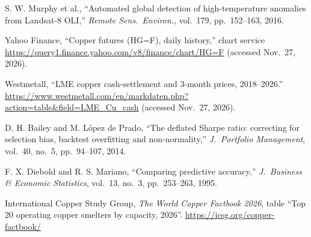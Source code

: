 \documentclass[10pt,a4paper]{article}
\begin{document}
\begin{enumerate}[label={[\arabic*]},leftmargin=2.2em,itemsep=1pt]
\item S. W. Murphy et al., ``Automated global detection of high-temperature anomalies from Landsat-8 OLI,'' \emph{Remote Sens.\ Environ.}, vol.\ 179, pp.\ 152--163, 2016.
\item Yahoo Finance, ``Copper futures (HG=F), daily history,'' chart service \url{https://query1.finance.yahoo.com/v8/finance/chart/HG=F} (accessed Nov.\ 27, 2026).
\item Westmetall, ``LME copper cash-settlement and 3-month prices, 2018--2026.'' \url{https://www.westmetall.com/en/markdaten.php?action=table&field=LME_Cu_cash} (accessed Nov.\ 27, 2026).
\item D. H. Bailey and M. L\'opez de Prado, ``The deflated Sharpe ratio: correcting for selection bias, backtest overfitting and non-normality,'' \emph{J.\ Portfolio Management}, vol.\ 40, no.\ 5, pp.\ 94--107, 2014.
\item F. X. Diebold and R. S. Mariano, ``Comparing predictive accuracy,'' \emph{J.\ Business \& Economic Statistics}, vol.\ 13, no.\ 3, pp.\ 253--263, 1995.
\item International Copper Study Group, \emph{The World Copper Factbook 2026}, table ``Top 20 operating copper smelters by capacity, 2026''. \url{https://icsg.org/copper-factbook/}
\end{enumerate}
\end{document}
